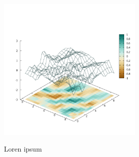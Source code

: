 
\begin{floatingfigure}[hr!]{4.5cm}
 \centering
         \includegraphics[width=7cm]{img/Plate0_A1.png}
         \caption[lorem]{Loren ipsum}
         \label{fig:Plate0_A1_}
\end{floatingfigure}
\lipsum[1-2]

